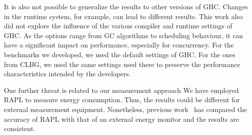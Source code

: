 It is also not possible to generalize the results to other versions of GHC. Changes in the runtime system, for example, can lead to different results. This work also did not explore the influence of the various compiler and runtime settings of GHC. As the options range from GC algorithms to scheduling behaviour, it can have a significant impact on performance, especially for concurrency. For the benchmarks we developed, we used the default settings of GHC. For the ones from CLBG, we used the same settings used there to preserve the performance characteristics intended by the developers.

One further threat is related to our measurement approach We have employed RAPL to measure energy consumption. Thus, the results could be different for external measurement equipment. Nonetheless, previous work~\cite{hahnel:2012} has compared the accuracy of RAPL with that of an external energy monitor and the results are consistent.
